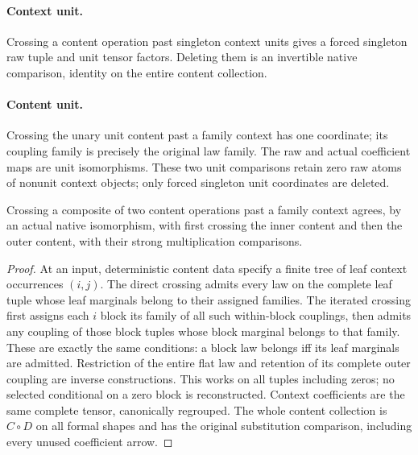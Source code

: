 \documentclass[11pt]{article}
\begin{document}
\paragraph{Context unit.} Crossing a content operation past singleton context units gives a forced singleton raw tuple and unit tensor factors. Deleting them is an invertible native comparison, identity on the entire content collection.

\paragraph{Content unit.} Crossing the unary unit content past a family context has one coordinate; its coupling family is precisely the original law family. The raw and actual coefficient maps are unit isomorphisms. These two unit comparisons retain zero raw atoms of nonunit context objects; only forced singleton unit coordinates are deleted.

\begin{proposition}
Crossing a composite of two content operations past a family context agrees, by an actual native isomorphism, with first crossing the inner content and then the outer content, with their strong multiplication comparisons.
\end{proposition}
\begin{proof}
At an input, deterministic content data specify a finite tree of leaf context occurrences $(i,j)$. The direct crossing admits every law on the complete leaf tuple whose leaf marginals belong to their assigned families. The iterated crossing first assigns each $i$ block its family of all such within-block couplings, then admits any coupling of those block tuples whose block marginal belongs to that family. These are exactly the same conditions: a block law belongs iff its leaf marginals are admitted. Restriction of the entire flat law and retention of its complete outer coupling are inverse constructions. This works on all tuples including zeros; no selected conditional on a zero block is reconstructed. Context coefficients are the same complete tensor, canonically regrouped. The whole content collection is $C\circ D$ on all formal shapes and has the original substitution comparison, including every unused coefficient arrow.\end{proof}
\end{document}
